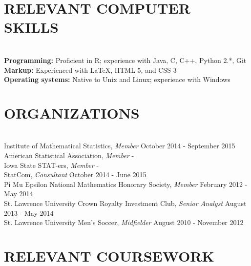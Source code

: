 \documentclass{res} %
\begin{document}
\begin{resume}

\section{RELEVANT COMPUTER SKILLS}

\hrulefill \\
{\bf Programming:} Proficient in R; experience with Java, C, C++, Python 2.*, Git \\
{\bf Markup:} Experienced with \LaTeX, HTML 5, and CSS 3 \\
{\bf Operating systems:} Native to Unix and Linux; experience with Windows 


\section{ORGANIZATIONS}

\hrulefill \\
Institute of Mathematical Statistics, {\sl Member} \dotfill October 2014 - September 2015\\
American Statistical Association, {\sl Member} \hfill - \\
Iowa State STAT-ers, {\sl Member} \hfill - \\
StatCom, {\sl Consultant} \dotfill October 2014 - June 2015\\
Pi Mu Epsilon National Mathematics Honorary Society, {\sl Member} \dotfill February 2012 - May 2014 \\
St. Lawrence University Crown Royalty Investment Club, {\sl Senior Analyst} \dotfill August 2013 - May 2014 \\
St. Lawrence University Men's Soccer, {\sl Midfielder} \dotfill August 2010 - November 2012 


\section{RELEVANT COURSEWORK}


\end{resume}
\end{document}
